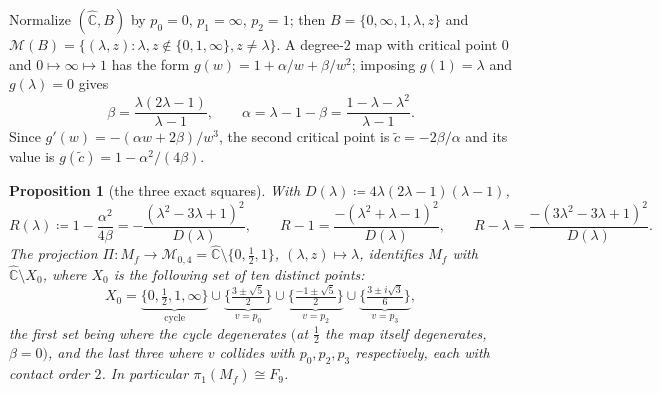 \documentclass[11pt]{article}
\newtheorem{proposition}[theorem]{Proposition}
\theoremstyle{definition}
\theoremstyle{remark}
\newcommand{\MM}{\mathcal M}
\newcommand{\Chat}{\widehat{\mathbb C}}
\begin{document}
Normalize $(\Chat,B)$ by $p_0=0$, $p_1=\infty$, $p_2=1$; then
$B=\{0,\infty,1,\lambda,z\}$ and
$\MM(B)=\{(\lambda,z):\lambda,z\notin\{0,1,\infty\},z\neq\lambda\}$.
A degree-$2$ map with critical point $0$ and $0\mapsto\infty\mapsto1$
has the form $g(w)=1+\alpha/w+\beta/w^2$; imposing $g(1)=\lambda$ and
$g(\lambda)=0$ gives
\[
\beta=\frac{\lambda(2\lambda-1)}{\lambda-1},\qquad
\alpha=\lambda-1-\beta=\frac{1-\lambda-\lambda^2}{\lambda-1}.
\]
Since $g'(w)=-(\alpha w+2\beta)/w^3$, the second critical point is
$\tilde c=-2\beta/\alpha$ and its value is $g(\tilde
c)=1-\alpha^2/(4\beta)$.

\begin{proposition}[the three exact squares]\label{prop:R}
With $D(\lambda)\coloneqq 4\lambda(2\lambda-1)(\lambda-1)$,
\begin{equation}\label{eq:squares}
R(\lambda)\coloneqq 1-\frac{\alpha^2}{4\beta}
=-\frac{(\lambda^2-3\lambda+1)^2}{D(\lambda)},\qquad
R-1=\frac{-(\lambda^2+\lambda-1)^2}{D(\lambda)},\qquad
R-\lambda=\frac{-(3\lambda^2-3\lambda+1)^2}{D(\lambda)}.
\end{equation}
The projection $\Pi:M_f\to\MM_{0,4}=\Chat\setminus\{0,\tfrac12,1\}$,
$(\lambda,z)\mapsto\lambda$, identifies $M_f$ with
$\Chat\setminus X_0$, where $X_0$ is the following set of ten distinct
points:
\[
X_0=\underbrace{\{0,\tfrac12,1,\infty\}}_{\text{cycle}}\cup
\underbrace{\{\tfrac{3\pm\sqrt5}{2}\}}_{v=p_0}\cup
\underbrace{\{\tfrac{-1\pm\sqrt5}{2}\}}_{v=p_2}\cup
\underbrace{\{\tfrac{3\pm i\sqrt3}{6}\}}_{v=p_3},
\]
the first set being where the cycle degenerates $($at $\tfrac12$ the
map itself degenerates, $\beta=0)$, and the last three where $v$
collides with $p_0,p_2,p_3$ respectively, each with contact order $2$.
In particular $\pi_1(M_f)\cong F_9$.
\end{proposition}
\end{document}
